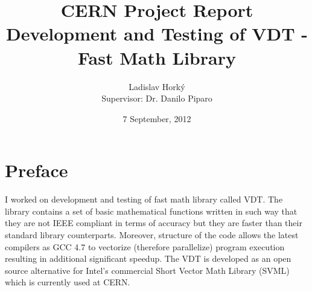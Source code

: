\documentclass[oneside,10pt,a4paper]{article}
\begin{document}
\title{CERN Project Report \\ Development and Testing of VDT - Fast Math Library}

\author{Ladislav Horký \\ Supervisor: Dr. Danilo Piparo}

\date{7 September, 2012}

\maketitle

\section{Preface}
I worked on development and testing of fast math library called VDT. The library contains a set of basic mathematical functions written in such way that they are not IEEE compliant in terms of accuracy but they are faster than their standard library counterparts. Moreover, structure of the code allows the latest compilers as GCC 4.7 to vectorize (therefore parallelize) program execution resulting in additional significant speedup. The VDT is developed as an open source alternative for Intel's commercial Short Vector Math Library (SVML) which is currently used at CERN.
\end{document}

